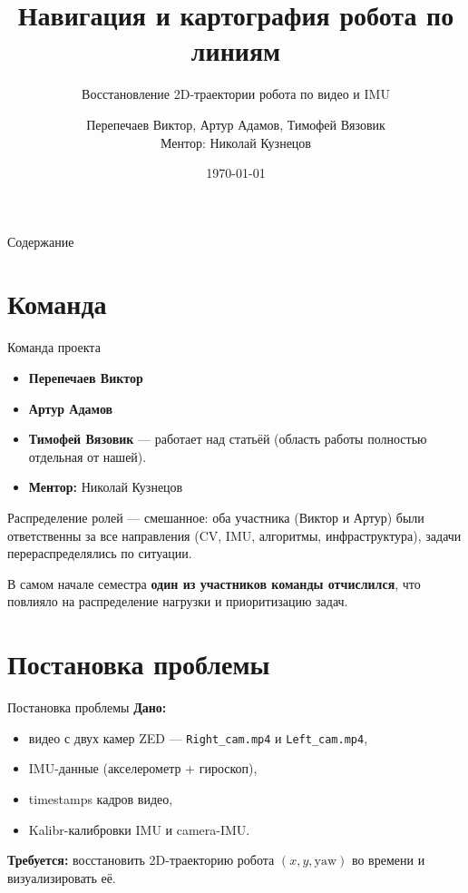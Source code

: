 \documentclass[aspectratio=169]{beamer}
\title[Навигация по линиям]{Навигация и картография робота по линиям}
\subtitle{Восстановление 2D-траектории робота по видео и IMU}
\author[В. Перепечаев, А. Адамов, Т. Вязовик]{Перепечаев Виктор, Артур Адамов, Тимофей Вязовик \\ Ментор: Николай Кузнецов}
\institute[МФТИ]{Московский физико-технический институт}
\date{\today}
\newcommand{\code}[1]{\texttt{#1}}
\begin{document}
\begin{frame}
    \titlepage
\end{frame}

\begin{frame}{Содержание}
    \tableofcontents
\end{frame}

\section{Команда}

\begin{frame}{Команда проекта}
    \begin{itemize}
        \item \textbf{Перепечаев Виктор}
        \item \textbf{Артур Адамов}
        \item \textbf{Тимофей Вязовик} --- работает над статьёй (область работы полностью отдельная от нашей).
        \item \textbf{Ментор:} Николай Кузнецов
    \end{itemize}

    \vspace{0.6em}
    Распределение ролей --- смешанное: оба участника (Виктор и Артур) были ответственны за все направления (CV, IMU, алгоритмы, инфраструктура), задачи перераспределялись по ситуации.

    \vspace{0.6em}
    \small В самом начале семестра \textbf{один из участников команды отчислился}, что повлияло на распределение нагрузки и приоритизацию задач.
\end{frame}

\section{Постановка проблемы}

\begin{frame}{Постановка проблемы}
    \textbf{Дано:}
    \begin{itemize}
        \item видео с двух камер ZED --- \code{Right\_cam.mp4} и \code{Left\_cam.mp4},
        \item IMU-данные (акселерометр + гироскоп),
        \item timestamps кадров видео,
        \item Kalibr-калибровки IMU и camera-IMU.
    \end{itemize}

    \vspace{0.6em}
    \textbf{Требуется:} восстановить 2D-траекторию робота $(x, y, \mathrm{yaw})$ во времени и визуализировать её.
\end{frame}
\end{document}
